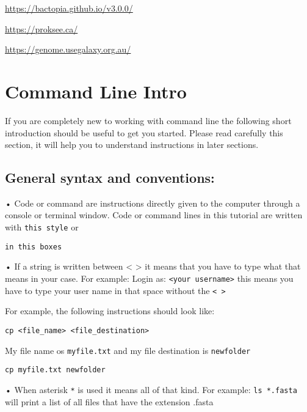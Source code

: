 \documentclass[
]{book}
\begin{document}
\url{https://bactopia.github.io/v3.0.0/}

\url{https://proksee.ca/}

\url{https://genome.usegalaxy.org.au/}

\hypertarget{command-line-intro}{%
\chapter{Command Line Intro}\label{command-line-intro}}

If you are completely new to working with command line the following short introduction should be useful to get you started. Please read carefully this section, it will help you to understand instructions in later sections.

\hypertarget{general-syntax-and-conventions}{%
\section{General syntax and conventions:}\label{general-syntax-and-conventions}}

• Code or command are instructions directly given to the computer through a console or terminal window. Code or command lines in this tutorial are written with \texttt{this\ style} or

\begin{verbatim}
in this boxes
\end{verbatim}

• If a string is written between \textless{} \textgreater{} it means that you have to type what that means in your case. For example: Login as: \texttt{\textless{}your\ username\textgreater{}} this means you have to type your user name in that space without the \texttt{\textless{}\ \textgreater{}}

For example, the following instructions should look like:

\begin{verbatim}
cp <file_name> <file_destination>
\end{verbatim}

My file name os \texttt{myfile.txt} and my file destination is \texttt{newfolder}

\begin{verbatim}
cp myfile.txt newfolder
\end{verbatim}

• When asterisk \texttt{*} is used it means all of that kind. For example: \texttt{ls\ *.fasta} will print a list of all files that have the extension .fasta
\end{document}
